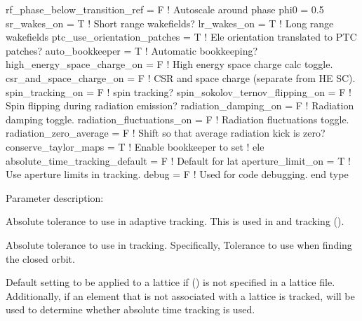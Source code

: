 {\begin{example}
    rf_phase_below_transition_ref = F   ! Autoscale around phase phi0 = 0.5
    sr_wakes_on = T                     ! Short range wakefields?
    lr_wakes_on = T                     ! Long range wakefields
    ptc_use_orientation_patches = T     ! Ele orientation translated to PTC patches?
    auto_bookkeeper = T                 ! Automatic bookkeeping?
    high_energy_space_charge_on = F     ! High energy space charge calc toggle.
    csr_and_space_charge_on = F         ! CSR and space charge (separate from HE SC).
    spin_tracking_on = F                ! spin tracking?
    spin_sokolov_ternov_flipping_on = F ! Spin flipping during radiation emission?
    radiation_damping_on = F            ! Radiation damping toggle.
    radiation_fluctuations_on = F       ! Radiation fluctuations toggle.
    radiation_zero_average = F          ! Shift so that average radiation kick is zero?
    conserve_taylor_maps = T            ! Enable bookkeeper to set
                                        ! ele%
    absolute_time_tracking_default = F  ! Default for lat%
    aperture_limit_on = T               ! Use aperture limits in tracking.
    debug = F                           ! Used for code debugging.
  end type
\end{example}

Parameter description:
\begin{description}
\item[\vn{abs_tol_adaptive_tracking}] \Newline
Absolute tolerance to use in adaptive tracking. This is used in  and
 tracking ().
%
\item[\vn{abs_tol_tracking}] \Newline
Absolute tolerance to use in tracking. Specifically, Tolerance to use when finding the closed orbit.
%
\item[\vn{absolute_time_tracking_default}] \Newline
Default setting to be applied to a lattice if  () is not
specified in a lattice file. Additionally, if an element that is not associated with a lattice is
tracked,  will be used to determine whether absolute time
tracking is used.


\end{description}}
